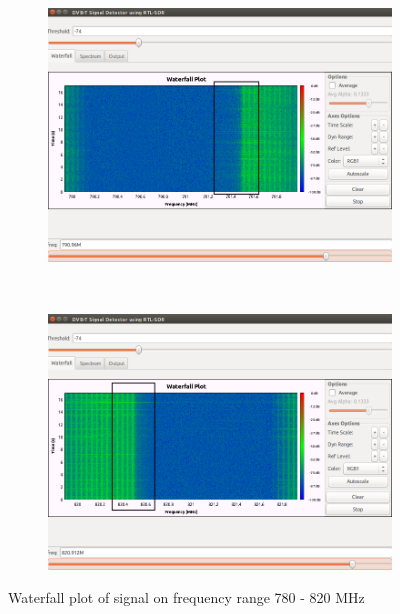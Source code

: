 \begin{figure}[H]
    \centering
    \begin{subfigure}[b]{0.45\textwidth}
        \includegraphics[width=\textwidth]{figures/false-alarm-1}
    \end{subfigure}
    ~ %
    \begin{subfigure}[b]{0.45\textwidth}
        \includegraphics[width=\textwidth]{figures/false-alarm-2}
    \end{subfigure}
    \caption{Waterfall plot of signal on frequency range 780 - 820 MHz}\label{fig:no-signal}
\end{figure}

